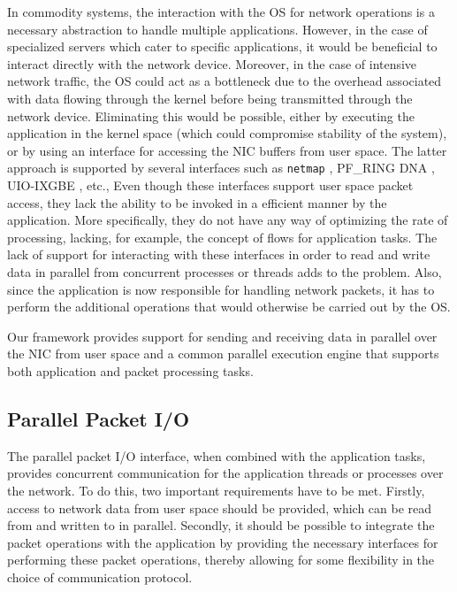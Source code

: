 \documentclass[conference]{IEEEtran}
\newcommand{\comment}[1]{}
\begin{document}
\comment{Most extant stream applications depend on the OS for their communication tasks.}In commodity systems, the interaction with the OS for network operations is a necessary abstraction to handle multiple applications. However, in the case of specialized servers which cater to specific applications, it would be beneficial to interact directly with the network device. Moreover, in the case of intensive network traffic, the OS could act as a bottleneck due to the overhead associated with data flowing through the kernel before being transmitted through the network device\cite{Wu:2007:PPB:1323954.1323957}\cite{Wu:2007:PAL:1227865.1228021}. Eliminating this would be possible, either by executing the application in the kernel space (which could compromise stability of the system), or by using an interface for accessing the NIC buffers from user space. The latter approach is supported by several interfaces such as \texttt{netmap} \cite{Rizzo:2012:RNI:2090147.2103536}, PF\_RING DNA \cite{1564468}, UIO-IXGBE \cite{Krasnyansky}, etc., Even though these interfaces support user space packet access, they lack the ability to be invoked in a efficient manner by the application. More specifically, they do not have any way of optimizing the rate of processing, lacking, for example, the concept of flows for application tasks. The lack of support for interacting with these interfaces in order to read and write data in parallel from concurrent processes or threads adds to the problem. Also, since the application is now responsible for handling network packets, it has to perform the additional operations that would otherwise be carried out by the OS.

Our framework provides support for sending and receiving data in parallel over the NIC from user space and a common parallel execution engine that supports both application and packet processing tasks.

\subsection{Parallel Packet I/O}
\label{ppio}
The parallel packet I/O interface, when combined with the application tasks, provides concurrent communication for the application threads or processes over the network. To do this, two important requirements have to be met. Firstly, access to network data from user space should be provided, which can be read from and written to in parallel. Secondly, it should be possible to integrate the packet operations with the application by providing the necessary interfaces for performing these packet operations, thereby allowing for some flexibility in the choice of communication protocol.
\end{document}
